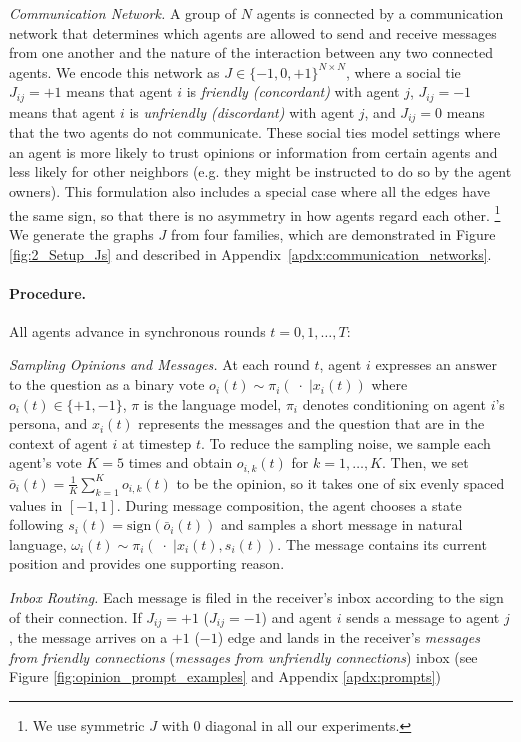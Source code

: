 \textit{Communication Network.} A group of $N$ agents is connected by a communication network that determines which agents are allowed to send and receive messages from one another and the nature of the interaction between any two connected agents. We encode this network as $J \in \{-1,0,+1\}^{N\times N}$, where
a social tie $J_{ij}=+1$ means that agent $i$ is \textit{friendly (concordant)} with agent $j$, $J_{ij}=-1$ means that agent $i$ is \textit{unfriendly (discordant)} with agent $j$, and $J_{ij}=0$ means that the two agents do not communicate. These social ties model settings where an agent is more likely to trust opinions or information from certain agents and less likely for other neighbors (e.g. they might be instructed to do so by the agent owners). This formulation also includes a special case where all the edges have the same sign, so that there is no asymmetry in how agents regard each other. 
\footnote{We use symmetric $J$ with $0$ diagonal in all our experiments.} We generate the graphs $J$ from four families, which are demonstrated in Figure \ref{fig:2_Setup_Js} and described in Appendix~\ref{apdx:communication_networks}.

\paragraph{Procedure.}
All agents advance in synchronous rounds $t = 0,1,\dots,T$:

\textit{Sampling Opinions and Messages.} At each round $t$, agent $i$ expresses an answer to the question as a binary vote  $o_i(t) \sim \pi_i(\;\cdot\; | x_i(t))$ where $o_i(t) \in \{+1, -1\}$, $\pi$ is the language model, $\pi_i$ denotes conditioning on agent $i$'s persona, and $x_i(t)$ represents the messages and the question that are in the context of agent $i$ at timestep $t$. To reduce the sampling noise, we sample each agent's vote $K=5$ times and obtain $o_{i,k}(t)$ for $k = 1,\dots,K$. Then, we set $\bar{o}_i(t) = \frac{1}{K}\sum_{k=1}^K o_{i,k}(t)$ to be the opinion, so it takes one of six evenly spaced values in $[-1, 1]$. During message composition, the agent chooses a state following $s_i(t) = \text{sign}(\bar{o}_i(t))$ and samples a short message in natural language, $\omega_i(t) \sim \pi_i(\;\cdot\; | x_i(t), s_i(t) )$. The message contains its current position and provides one supporting reason.

\textit{Inbox Routing.} Each message is filed in the receiver's inbox according to the sign of their connection. If $J_{ij}=+1$ ($J_{ij}=-1$) and agent $i$ sends a message to agent $j$, the message arrives on a $+1$ ($-1$) edge and lands in the receiver's \textit{messages from friendly connections} (\textit{messages from unfriendly connections}) inbox (see Figure \ref{fig:opinion_prompt_examples} and Appendix \ref{apdx:prompts})

